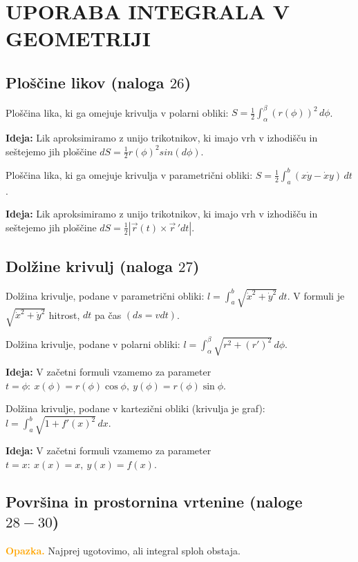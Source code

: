 \section{UPORABA INTEGRALA V GEOMETRIJI}
{\color{Purple} \subsection*{Ploščine likov (naloga $26$)}}
Ploščina lika, ki ga omejuje krivulja v polarni obliki: $\displaystyle S = \frac{1}{2} \int_{\alpha}^{\beta} (r(\phi))^2  \,d \phi $.

\textbf{Ideja:} Lik aproksimiramo z unijo trikotnikov, ki imajo vrh v izhodišču in seštejemo jih ploščine $dS = \frac{1}{2} r(\phi)^2 sin(d \phi)$.

Ploščina lika, ki ga omejuje krivulja v parametrični obliki: $\displaystyle S = \frac{1}{2} \int_{a}^{b} (x \dot{y} - \dot{x}y )  \,d t $.

\textbf{Ideja:} Lik aproksimiramo z unijo trikotnikov, ki imajo vrh v izhodišču in seštejemo jih ploščine $dS = \frac{1}{2} |\vec{r}(t) \times \vec{r} \, 'dt|$.


{\color{Purple} \subsection*{Dolžine krivulj (naloga $27$)}}
Dolžina krivulje, podane v parametrični obliki: $\displaystyle l = \int_{a}^{b} \sqrt{\dot{x}^2 + \dot{y}^2}  \,dt $. V formuli je $\displaystyle \sqrt{\dot{x}^2 + \dot{y}^2}$ hitrost, $dt$ pa čas $(ds = vdt)$.

Dolžina krivulje, podane v polarni obliki: $\displaystyle l = \int_{\alpha}^{\beta} \sqrt{r^2 + (r')^2}  \,d \phi $.

\textbf{Ideja:}  V začetni formuli vzamemo za parameter $t = \phi: \ x(\phi) = r(\phi) \cos \phi, \ y(\phi) = r(\phi) \sin \phi$.

Dolžina krivulje, podane v kartezični obliki (krivulja je graf): $\displaystyle l = \int_{a}^{b} \sqrt{1 + f'(x)^2}  \,d x $.

\textbf{Ideja:}  V začetni formuli vzamemo za parameter $t = x: \ x(x) = x, \ y(x) = f(x)$.

{\color{Purple} \subsection*{Površina in prostornina vrtenine (naloge $28-30$)}}
\textbf{\textcolor{Orange}{Opazka.}} Najprej ugotovimo, ali integral sploh obstaja.

